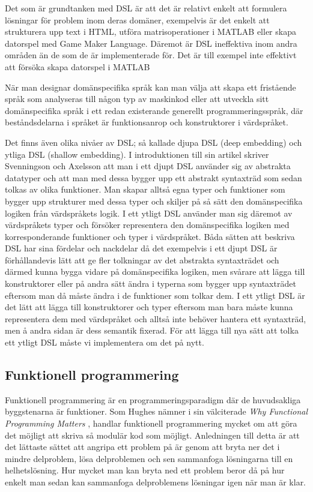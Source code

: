 \documentclass[]{article}
\begin{document}
Det som är grundtanken med DSL är att det är relativt enkelt att formulera lösningar
för problem inom deras domäner, exempelvis är det enkelt att strukturera upp text i
HTML, utföra matrisoperationer i MATLAB eller skapa datorspel med Game Maker Language.
Däremot är DSL ineffektiva inom andra områden än de som de är implementerade för.
Det är till exempel inte effektivt att försöka skapa datorspel i MATLAB

När man designar domänspecifika språk kan man välja att skapa ett fristående
språk som analyseras till någon typ av maskinkod eller att utveckla sitt
domänspecifika språk i ett redan existerande generellt programmeringsspråk,
där beståndsdelarna i språket är funktionsanrop och konstruktorer i värdspråket.

Det finns även olika nivåer av DSL; så kallade djupa DSL (deep embedding) och
ytliga DSL (shallow embedding). I introduktionen till sin artikel skriver
Svenningson och Axelsson \cite{Svenningsson2013} att man i ett djupt
DSL använder sig av abstrakta datatyper och att man med dessa bygger upp ett
abstrakt syntaxträd som sedan tolkas av olika funktioner.
Man skapar alltså egna typer och funktioner som bygger upp strukturer med dessa
typer och skiljer på så sätt den domänspecifika logiken från värdspråkets logik.
I ett ytligt DSL använder man sig däremot av värdspråkets typer och försöker
representera den domänspecifika logiken med korresponderande funktioner och
typer i värdspråket.
Båda sätten att beskriva DSL har sina fördelar och nackdelar då det exempelvis
i ett djupt DSL är förhållandevis lätt att ge fler tolkningar av det abstrakta
syntaxträdet och därmed kunna bygga vidare på domänspecifika logiken,
men svårare att lägga till konstruktorer eller på andra sätt ändra i typerna som
bygger upp syntaxträdet eftersom man då måste ändra i de funktioner som tolkar
dem. I ett ytligt DSL är det lätt att lägga till konstruktorer och typer
eftersom man bara måste kunna representera dem med värdspråket och alltså inte
behöver hantera ett syntaxträd, men å andra sidan är dess semantik fixerad.
För att lägga till nya sätt att tolka ett ytligt DSL måste vi implementera
om det på nytt.

\subsection{Funktionell programmering}
Funktionell programmering är en programmeringsparadigm där de huvudsakliga
byggstenarna är funktioner.
Som Hughes nämner i sin välciterade \textit{Why Functional Programming Matters}
\cite{hughes1989functional}, handlar funktionell programmering mycket om att göra det
möjligt att skriva så modulär kod som möjligt.
Anledningen till detta är att det lättaste sättet att angripa ett problem på är
genom att bryta ner det i mindre delproblem, lösa delproblemen och sen
sammanfoga lösningarna till en helhetslösning.
Hur mycket man kan bryta ned ett problem beror då på hur enkelt man sedan kan
sammanfoga delproblemens lösningar igen när man är klar.
\end{document}
